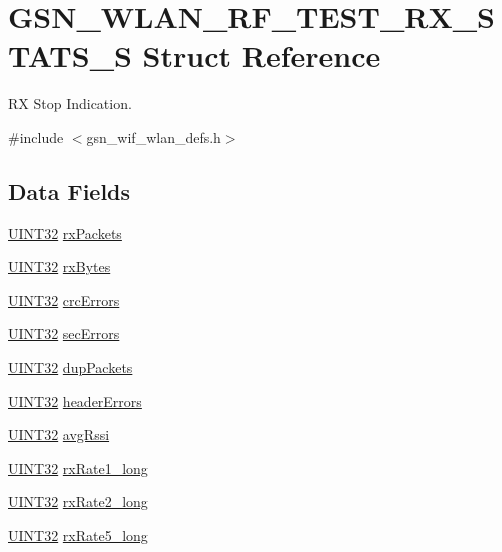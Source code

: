 \hypertarget{a00419}{
\section{GSN\_\-WLAN\_\-RF\_\-TEST\_\-RX\_\-STATS\_\-S Struct Reference}
\label{a00419}
}


RX Stop Indication.  




{\ttfamily \#include $<$gsn\_\-wif\_\-wlan\_\-defs.h$>$}

\subsection*{Data Fields}
\begin{DoxyCompactItemize}
\item 
\hyperlink{a00660_gae1e6edbbc26d6fbc71a90190d0266018}{UINT32} \hyperlink{a00419_afcd1c82d474f2f73a78e52d4e94476df}{rxPackets}
\item 
\hyperlink{a00660_gae1e6edbbc26d6fbc71a90190d0266018}{UINT32} \hyperlink{a00419_a52f6cb688103c306d61204cb54e4034e}{rxBytes}
\item 
\hyperlink{a00660_gae1e6edbbc26d6fbc71a90190d0266018}{UINT32} \hyperlink{a00419_ac9b3007dce9f0a2ed0beb12a555714c2}{crcErrors}
\item 
\hyperlink{a00660_gae1e6edbbc26d6fbc71a90190d0266018}{UINT32} \hyperlink{a00419_a2291caa4b52ab4dea6c361d80b0f6c26}{secErrors}
\item 
\hyperlink{a00660_gae1e6edbbc26d6fbc71a90190d0266018}{UINT32} \hyperlink{a00419_a421dbc2a77d6e1a45c530621ee89cfbc}{dupPackets}
\item 
\hyperlink{a00660_gae1e6edbbc26d6fbc71a90190d0266018}{UINT32} \hyperlink{a00419_a0f1c4f5fe659d34ed0dcc9dd23be1722}{headerErrors}
\item 
\hyperlink{a00660_gae1e6edbbc26d6fbc71a90190d0266018}{UINT32} \hyperlink{a00419_a56446535fa6c2eb154a14f04a0d56b37}{avgRssi}
\item 
\hyperlink{a00660_gae1e6edbbc26d6fbc71a90190d0266018}{UINT32} \hyperlink{a00419_ab9ee3e556b01c109d42c0a5b6121bb90}{rxRate1\_\-long}
\item 
\hyperlink{a00660_gae1e6edbbc26d6fbc71a90190d0266018}{UINT32} \hyperlink{a00419_a71f4b1623d813286a889f77e7a79e72a}{rxRate2\_\-long}
\item 
\hyperlink{a00660_gae1e6edbbc26d6fbc71a90190d0266018}{UINT32} \hyperlink{a00419_a7b9f0d9e5077367d2ca6d1663b634bb0}{rxRate5\_\-long}

\end{DoxyCompactItemize}
